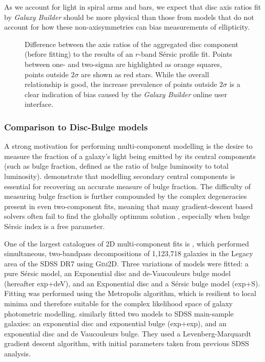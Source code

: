 \documentclass[trackchanges]{aastex63}
\begin{document}
As we account for light in spiral arms and bars, we expect that disc axis ratios fit by \textit{Galaxy Builder} should be more physical than those from models that do not account for how these non-axisymmetries can bias measurements of ellipticity.

\begin{figure}
  \caption{Difference between the axis ratios of the aggregated disc component (before fitting) to the results of an $r$-band S\'ersic profile fit. Points  between one- and two-sigma are highlighted as orange squares, points outside $2\sigma$ are shown as red stars. While the overall relationship is good, the increase prevalence of points outside $2\sigma$ is a clear indication of bias caused by the \textit{Galaxy Builder} online user interface.}
  \label{fig:ax_ratio_comparison}
\end{figure}


\subsubsection{Comparison to Disc-Bulge models}

A strong motivation for performing multi-component modelling is the desire to measure the fraction of a galaxy's light being emitted by its central components (such as bulge fraction, defined as the ratio of bulge luminosity to total luminosity). \citet{Gao2017:1709.00746v1} demonstrate that modelling secondary central components is essential for recovering an accurate measure of bulge fraction. The difficulty of measuring bulge fraction is further compounded by the complex degeneracies present in even two-component fits, meaning that many gradient-descent based solvers often fail to find the globally optimum solution \citep{profit-paper}, especially when bulge S\'ersic index is a free parameter.

One of the largest catalogues of 2D multi-component fits is \citet{2011ApJS..196...11S}, which performed simultaneous, two-bandpass decompositions of 1,123,718 galaxies in the Legacy area of the SDSS DR7 using \textsc{Gim2D}. Three variations of models were fitted: a pure S\'ersic model, an Exponential disc and de-Vaucouleurs bulge model (hereafter exp+deV), and an Exponential disc and a S\'ersic bulge model (exp+S). Fitting was performed using the Metropolis algorithm, which is resilient to local minima and therefore suitable for the complex likelihood space of galaxy photometric modelling. \citet{2012MNRAS.421.2277L} similarly fitted two models to SDSS main-sample galaxies: an exponential disc and exponential bulge (exp+exp), and an exponential disc and de Vaucouleurs bulge. They used a Levenberg-Marquardt gradient descent algorithm, with initial parameters taken from previous SDSS analysis.
\end{document}
